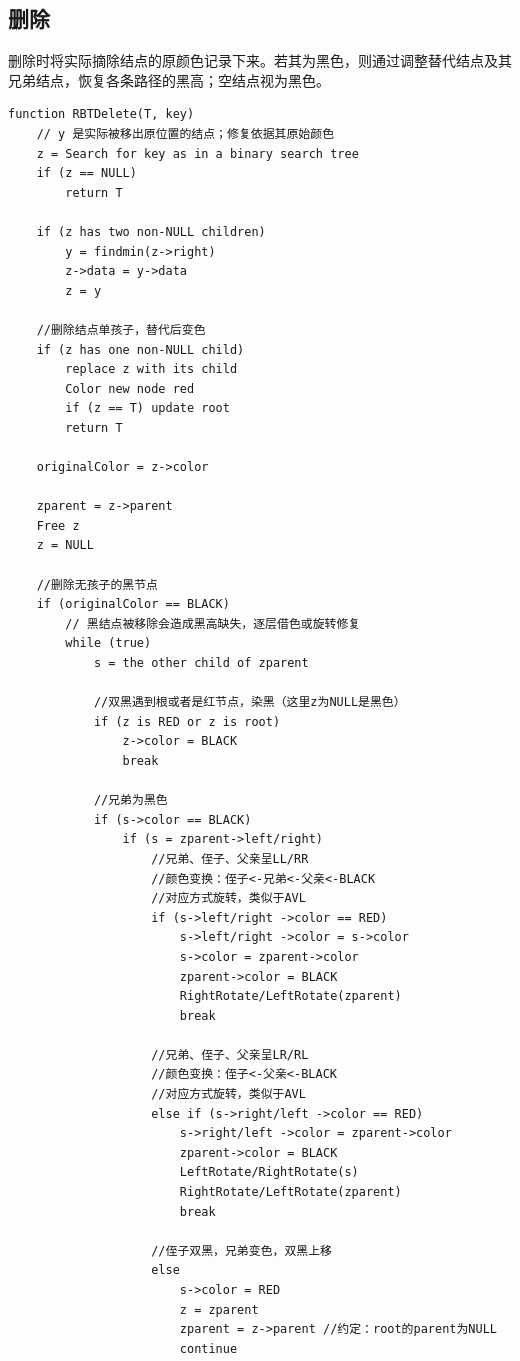 \documentclass[openany]{book}
\begin{document}
\subsection{删除}
删除时将实际摘除结点的原颜色记录下来。若其为黑色，则通过调整替代结点及其兄弟结点，恢复各条路径的黑高；空结点视为黑色。
\begin{lstlisting}
function RBTDelete(T, key)
    // y 是实际被移出原位置的结点；修复依据其原始颜色
    z = Search for key as in a binary search tree
    if (z == NULL)
        return T

    if (z has two non-NULL children)
        y = findmin(z->right)
        z->data = y->data
        z = y

    //删除结点单孩子，替代后变色
    if (z has one non-NULL child)
        replace z with its child
        Color new node red
        if (z == T) update root
        return T

    originalColor = z->color

    zparent = z->parent
    Free z
    z = NULL

    //删除无孩子的黑节点
    if (originalColor == BLACK)
        // 黑结点被移除会造成黑高缺失，逐层借色或旋转修复
        while (true)
            s = the other child of zparent 

            //双黑遇到根或者是红节点，染黑（这里z为NULL是黑色）
            if (z is RED or z is root)
                z->color = BLACK
                break

            //兄弟为黑色
            if (s->color == BLACK)
                if (s = zparent->left/right)
                    //兄弟、侄子、父亲呈LL/RR
                    //颜色变换：侄子<-兄弟<-父亲<-BLACK
                    //对应方式旋转，类似于AVL
                    if (s->left/right ->color == RED)
                        s->left/right ->color = s->color
                        s->color = zparent->color 
                        zparent->color = BLACK
                        RightRotate/LeftRotate(zparent)
                        break

                    //兄弟、侄子、父亲呈LR/RL
                    //颜色变换：侄子<-父亲<-BLACK
                    //对应方式旋转，类似于AVL
                    else if (s->right/left ->color == RED)
                        s->right/left ->color = zparent->color 
                        zparent->color = BLACK
                        LeftRotate/RightRotate(s)
                        RightRotate/LeftRotate(zparent)
                        break

                    //侄子双黑，兄弟变色，双黑上移
                    else
                        s->color = RED 
                        z = zparent
                        zparent = z->parent //约定：root的parent为NULL
                        continue
        

\end{lstlisting}
\end{document}
